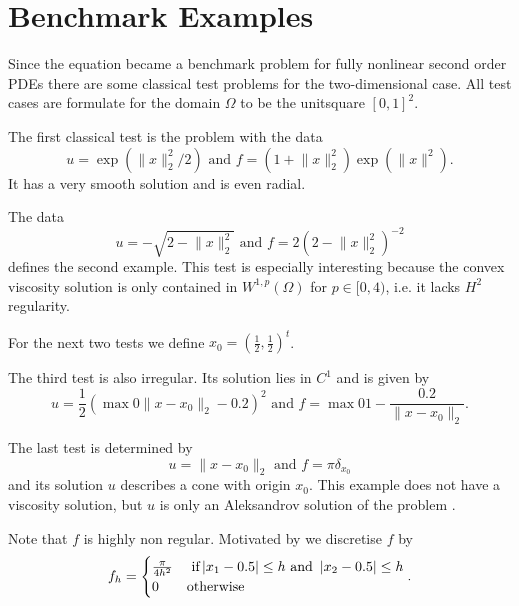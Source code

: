 \section{Benchmark Examples}

Since the \MA equation became a benchmark problem for fully nonlinear second order PDEs there are some classical test problems for the two-dimensional case. All test cases are formulate for the domain $\Omega$ to be the unitsquare $[0,1]^2$.

\begin{test} \label{test smooth}
The first classical \MA test is the problem with the data
\[
	u=\exp( \lVert x \rVert_2^2  /2) 
	\text { and } 
	f = (1 + \lVert x \rVert_2^2) \exp( \lVert x \rVert^2).
\]
It has a very smooth solution and is even radial.

\end{test}

\begin{test}\label{test sqrt}
The data
\[
	u = - \sqrt{ 2-  \lVert x \rVert_2^2}
	\text { and } 
	f = 2\left( 2-  \lVert x \rVert_2^2 \right)^{-2}
\]
defines the second example. This test is especially interesting because the convex viscosity solution is only contained in $W^{1,p}(\Omega) $ for $p \in [0,4)$\cite{DG2006a}, i.e. it lacks $H^2$ regularity.
\end{test}

For the next two tests we define $x_0 = \left(\frac 1 2, \frac 1 2  \right)^t$.

\begin{test}\label{test singularity}
The third \MA test is also irregular. Its solution lies in $C^1$ and is given by
\[
	u=\frac 1 2 \left( \max 0 {\lVert x - x_0 \rVert_2-0.2 }  \right)^2 
	\text { and } 
	f = \max 0 {1-\frac {0.2} {\lVert x - x_0 \rVert_2} }.
\]
\end{test}


\begin{test}\label{test dirac}
The last test is determined by
\[
	u = \lVert x - x_0 \rVert_2
	\text { and } 
	f = \pi \delta_{x_0}
\]
and its solution $u$ describes a cone with origin $x_0$. This example does not have a viscosity solution, but $u$ is only an Aleksandrov solution of the problem \cite[Section 2.3.]{FO2011}.

Note that $f$ is highly non regular. Motivated by \cite[Section 6.1.]{FO2011} we discretise $f$ by
\begin{align*}
	f_h = \begin{cases}
		\frac \pi {4h^2} & \text{ if} \left| x_1 - 0.5 \right| \leq h \text{ and } \left| x_2 - 0.5 \right| \leq h \\
		0	& \text{otherwise}
	\end{cases}.
\end{align*}
\end{test}


